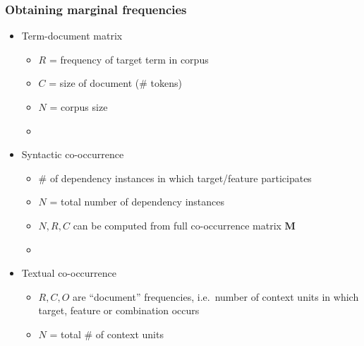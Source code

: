 \documentclass[t]{beamer} %
\begin{document}
\begin{frame}
  \frametitle{Obtaining marginal frequencies \citep{Evert:08}}

  \begin{itemize}
  \item Term-document matrix
    \begin{itemize}
    \item $R$ = frequency of target term in corpus
    \item $C$ = size of document (\# tokens)
    \item $N$ = corpus size
    \item[]
    \end{itemize}
  \item<2-> Syntactic co-occurrence
    \begin{itemize}
    \item \# of dependency instances in which target/feature participates
    \item $N$ = total number of dependency instances 
    \item $N, R, C$ can be computed from full co-occurrence matrix $\mathbf{M}$
    \item[]
    \end{itemize}
  \item<3-> Textual co-occurrence
    \begin{itemize}
    \item $R, C, O$ are ``document'' frequencies, i.e.\ number of context units in which target, feature or combination occurs
    \item $N$ = total \# of context units
    \end{itemize}
  \end{itemize}
\end{frame}
\end{document}
